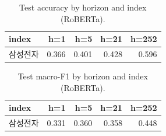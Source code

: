 \begin{table}[t]\centering
\caption{Test accuracy by horizon and index (RoBERTa).}
\begin{tabular}{lrrrr}
\toprule
index & h=1 & h=5 & h=21 & h=252 \\
\midrule
삼성전자 & 0.366 & 0.401 & 0.428 & 0.596 \\
\bottomrule
\end{tabular}
\end{table}

\begin{table}[t]\centering
\caption{Test macro-F1 by horizon and index (RoBERTa).}
\begin{tabular}{lrrrr}
\toprule
index & h=1 & h=5 & h=21 & h=252 \\
\midrule
삼성전자 & 0.331 & 0.360 & 0.358 & 0.448 \\
\bottomrule
\end{tabular}
\end{table}